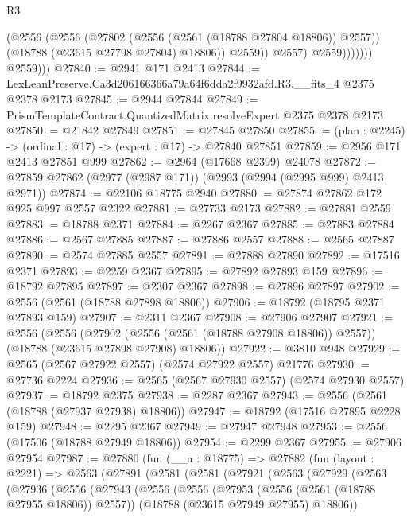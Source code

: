 \begin{lexlean}{R3}
\begin{coremodule}
                            (@2556
                              (@2556
                                (@27802 (@2556 (@2561 (@18788 @27804 @18806)) @2557))
                                (@18788 (@23615 @27798 @27804) @18806))
                              @2559))
                          @2557)
                        @2559)))))))
          @2559)))
@27840 := @2941 @171 @2413
@27844 := LexLeanPreserve.Ca3d206166366a79a64f6dda2f9932afd.R3.__fits_4 @2375 @2378 @2173
@27845 := @2944 @27844
@27849 := PrismTemplateContract.QuantizedMatrix.resolveExpert @2375 @2378 @2173
@27850 := @21842 @27849
@27851 := @27845 @27850
@27855 := (plan : @2245) -> (ordinal : @17) -> (expert : @17) -> @27840 @27851
@27859 := @2956 @171 @2413 @27851 @999
@27862 := @2964 (@17668 @2399) @24078
@27872 := @27859 @27862 (@2977 (@2987 @171)) (@2993 (@2994 (@2995 @999) @2413 @2971))
@27874 := @22106 @18775 @2940
@27880 := @27874 @27862 @172 @925 @997 @2557 @2322
@27881 := @27733 @2173
@27882 := @27881 @2559
@27883 := @18788 @2371
@27884 := @2267 @2367
@27885 := @27883 @27884
@27886 := @2567 @27885
@27887 := @27886 @2557
@27888 := @2565 @27887
@27890 := @2574 @27885 @2557
@27891 := @27888 @27890
@27892 := @17516 @2371
@27893 := @2259 @2367
@27895 := @27892 @27893 @159
@27896 := @18792 @27895
@27897 := @2307 @2367
@27898 := @27896 @27897
@27902 := @2556 (@2561 (@18788 @27898 @18806))
@27906 := @18792 (@18795 @2371 @27893 @159)
@27907 := @2311 @2367
@27908 := @27906 @27907
@27921 := @2556
    (@2556
      (@27902 (@2556 (@2561 (@18788 @27908 @18806)) @2557))
      (@18788 (@23615 @27898 @27908) @18806))
@27922 := @3810 @948
@27929 := @2565 (@2567 @27922 @2557) (@2574 @27922 @2557) @21776
@27930 := @27736 @2224
@27936 := @2565 (@2567 @27930 @2557) (@2574 @27930 @2557)
@27937 := @18792 @2375
@27938 := @2287 @2367
@27943 := @2556 (@2561 (@18788 (@27937 @27938) @18806))
@27947 := @18792 (@17516 @27895 @2228 @159)
@27948 := @2295 @2367
@27949 := @27947 @27948
@27953 := @2556 (@17506 (@18788 @27949 @18806))
@27954 := @2299 @2367
@27955 := @27906 @27954
@27987 := @27880
    (fun (__a : @18775) =>
    @27882
      (fun (layout : @2221) =>
      @2563
        (@27891
          (@2581
            (@2581
              (@27921
                (@2563
                  (@27929
                    (@2563
                      (@27936
                        (@2556
                          (@27943
                            (@2556
                              (@2556
                                (@27953 (@2556 (@2561 (@18788 @27955 @18806)) @2557))
                                (@18788 (@23615 @27949 @27955) @18806))

\end{coremodule}
\end{lexlean}
